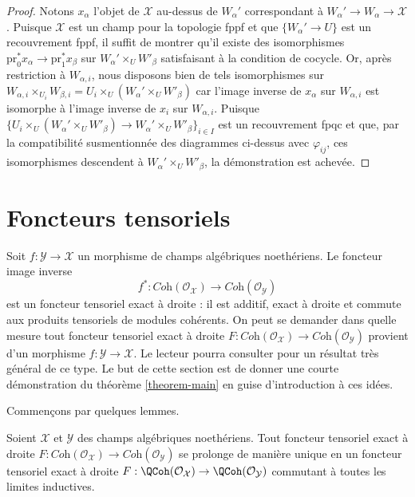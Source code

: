 \begin{proof}
\medskip\noindent
Notons $x_\alpha$ l'objet de $\mathcal{X}$ au-dessus de $W_\alpha'$
correspondant à $W_\alpha' \to W_\alpha \to \mathcal{X}$.
Puisque $\mathcal{X}$ est un champ pour la topologie fppf et que
$\{W_\alpha' \to U\}$ est un recouvrement fppf, il suffit
de montrer qu'il existe des isomorphismes
$\text{pr}_0^*x_\alpha \to \text{pr}_1^*x_\beta$
sur $W_\alpha' \times_U W'_\beta$ satisfaisant à la
condition de cocycle. Or, après restriction à
$W_{\alpha, i}$, nous disposons bien de tels isomorphismes sur
$W_{\alpha, i} \times_{U_i} W_{\beta, i} =
U_i \times_U (W_\alpha' \times_U W'_\beta)$
car l'image inverse de $x_\alpha$ sur $W_{\alpha, i}$
est isomorphe à l'image inverse de $x_i$ sur $W_{\alpha, i}$.
Puisque $\{U_i \times_U (W_\alpha' \times_U W'_\beta) \to
W_\alpha' \times_U W'_\beta\}_{i \in I}$
est un recouvrement fpqc et que, par la compatibilité susmentionnée
des diagrammes ci-dessus avec $\varphi_{ij}$, ces
isomorphismes descendent à $W_\alpha' \times_U W'_\beta$,
la démonstration est achevée.
\end{proof}










\section{Foncteurs tensoriels}
\label{section-tensor-functors}

\noindent
Soit $f : \mathcal{Y} \to \mathcal{X}$ un morphisme de champs algébriques
noethériens. Le foncteur image inverse
$$
f^* :
\textit{Coh}(\mathcal{O}_\mathcal{X})
\longrightarrow
\textit{Coh}(\mathcal{O}_\mathcal{Y})
$$
est un foncteur tensoriel exact à droite : il est additif, exact à droite
et commute aux produits tensoriels de modules cohérents. On peut
se demander dans quelle mesure tout foncteur tensoriel exact à droite
$F : \textit{Coh}(\mathcal{O}_\mathcal{X}) \to
\textit{Coh}(\mathcal{O}_\mathcal{Y})$ provient d'un
morphisme $f : \mathcal{Y} \to \mathcal{X}$.
Le lecteur pourra consulter
\cite{Hall-Rydh-coherent} pour un résultat très général
de ce type.
Le but de cette section est de donner une courte démonstration du
théorème \ref{theorem-main} en guise d'introduction à ces idées.

\medskip\noindent
Commençons par quelques lemmes.

\begin{lemma}
\label{lemma-extend}
Soient $\mathcal{X}$ et $\mathcal{Y}$ des champs algébriques noethériens.
Tout foncteur tensoriel exact à droite $F : \textit{Coh}(\mathcal{O}_\mathcal{X}) \to
\textit{Coh}(\mathcal{O}_\mathcal{Y})$ se prolonge de manière unique en un
foncteur tensoriel exact à droite
$F : \QCoh(\mathcal{O}_\mathcal{X}) \to \QCoh(\mathcal{O}_\mathcal{Y})$
commutant à toutes les limites inductives.
\end{lemma}

